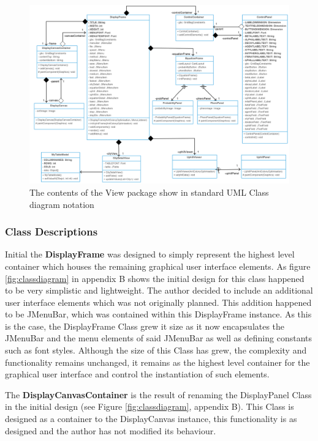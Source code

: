 \clearpage
\begin{figure}
\includegraphics[scale=0.225]{Images/chapter4/view}
\caption{The contents of the View package show in standard UML Class diagram notation}
\label{fig:classdiagramImp}
\end{figure}
\clearpage

\subsubsection{Class Descriptions}
\label{view:clss}
Initial the \textbf{DisplayFrame} was designed to simply represent the highest level container which houses the remaining graphical user interface elements. As figure \ref{fig:classdiagram} in appendix B shows the initial design for this class happened to be very simplistic and lightweight. The author decided to include an additional user interface elements which was not originally planned. This addition happened to be JMenuBar, which was contained within this DisplayFrame instance. As this is the case, the DisplayFrame Class grew it size as it now encapsulates the JMenuBar and the menu elements of said JMenuBar as well as defining constants such as font styles. Although the size of this Class has grew, the complexity and functionality remains unchanged, it remains as the highest level container for the graphical user interface and control the instantiation of such elements.

The \textbf{DisplayCanvasContainer} is the result of renaming the DisplayPanel Class in the initial design (see Figure \ref{fig:classdiagram}, appendix B). This Class is designed as a container to the DisplayCanvas instance, this functionality is as designed and the author has not modified its behaviour.

